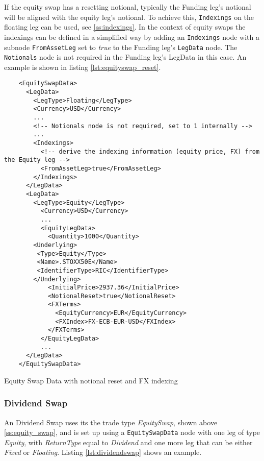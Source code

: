 If the equity swap has a resetting notional, typically the Funding leg's notional will be aligned with the equity leg's
notional. To achieve this, \lstinline!Indexings! on the floating leg can be used, see \ref{ss:indexings}. In the context of equity swaps the indexings can be defined in a simplified way by adding an \lstinline!Indexings! node with a subnode \lstinline!FromAssetLeg! set to \emph{true} to the Funding leg's \lstinline!LegData! node. The \lstinline!Notionals! node is not required  in the Funding leg's LegData in this
case. An example is shown in listing \ref{lst:equityswap_reset}.

\begin{listing}[H]
\begin{verbatim}
    <EquitySwapData>
      <LegData>
        <LegType>Floating</LegType>
        <Currency>USD</Currency>
        ...
        <!-- Notionals node is not required, set to 1 internally -->
        ...
        <Indexings>
          <!-- derive the indexing information (equity price, FX) from the Equity leg -->
          <FromAssetLeg>true</FromAssetLeg>
        </Indexings>
      </LegData>
      <LegData>
        <LegType>Equity</LegType>
          <Currency>USD</Currency>
          ...
          <EquityLegData>
            <Quantity>1000</Quantity>
		<Underlying>
		 <Type>Equity</Type>
		 <Name>.STOXX50E</Name>
		 <IdentifierType>RIC</IdentifierType>
		</Underlying>
            <InitialPrice>2937.36</InitialPrice>
            <NotionalReset>true</NotionalReset>
            <FXTerms>
              <EquityCurrency>EUR</EquityCurrency>
              <FXIndex>FX-ECB-EUR-USD</FXIndex>
            </FXTerms>
          </EquityLegData>
          ...
      </LegData>
    </EquitySwapData>
\end{verbatim}
\caption{Equity Swap Data with notional reset and FX indexing}
\label{lst:equityswap_reset}
\end{listing}

\subsubsection{Dividend Swap}
\label{ss:dividend_swap}

An Dividend Swap uses its the trade type \emph{EquitySwap}, shown above \ref{ss:equity_swap}, and is set up using a {\tt EquitySwapData} node with one leg of type  \emph{Equity}, with \emph{ReturnType} equal to \emph{Dividend} and one more leg that can be either \emph{Fixed} or  \emph{Floating}. Listing \ref{lst:dividendswap} shows an example.

